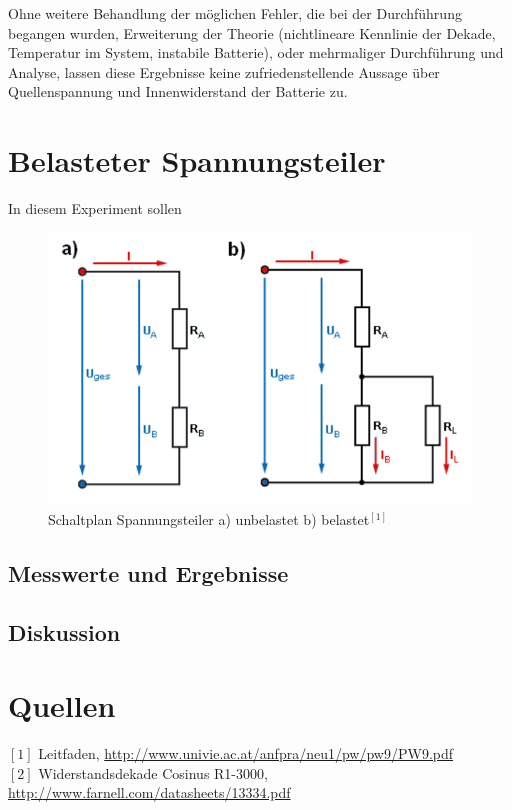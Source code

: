 \documentclass[12pt,a4paper]{article}
\begin{document}
\begin{multicols}{2}
Ohne weitere Behandlung der möglichen Fehler, die bei der Durchführung begangen wurden, Erweiterung der Theorie (nichtlineare Kennlinie der Dekade, Temperatur im System, instabile Batterie), oder mehrmaliger Durchführung und Analyse, lassen diese Ergebnisse keine zufriedenstellende Aussage über Quellenspannung und Innenwiderstand der Batterie zu.


\section{Belasteter Spannungsteiler}
In diesem Experiment sollen 
\begin{figure}[H]
	\centering
	\includegraphics[scale=0.4]{./figure/spannungsteiler_schaltplan.png}
	\caption{Schaltplan Spannungsteiler a) unbelastet b) belastet$^{[1]}$}
	\label{fig:schaltbild_solarzelle}
\end{figure}
\noindent

\subsection{Messwerte und Ergebnisse}



\subsection{Diskussion}



\section{Quellen}
$[1]$ Leitfaden, \url{http://www.univie.ac.at/anfpra/neu1/pw/pw9/PW9.pdf}\\
$[2]$ Widerstandsdekade Cosinus R1-3000, \url{http://www.farnell.com/datasheets/13334.pdf}\\

\end{multicols}
\end{document}
